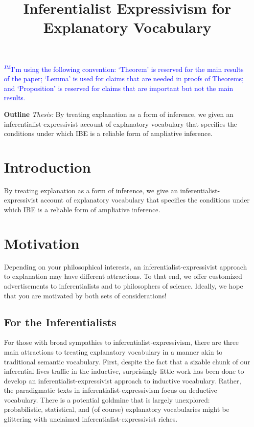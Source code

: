 \documentclass{article}
\theoremstyle{definition}
\theoremstyle{definition}
\theoremstyle{definition}
\theoremstyle{definition}
\theoremstyle{remark}
\theoremstyle{definition}
\theoremstyle{definition}
\newcommand{\jm}[1]{\textcolor{blue}{$^{\textrm{JM}}${#1}}}
\begin{document}
\sloppy
\title{Inferentialist Expressivism for Explanatory Vocabulary
}

\large
\raggedbottom

\maketitle

\jm{I'm using the following convention: `Theorem' is reserved for the main results of the paper; `Lemma' is used for claims that are needed in proofs of Theorems; and `Proposition' is reserved for claims that are important but not the main results.}

\textbf{Outline}
\textit{Thesis:} By treating explanation as a form of inference, we given an inferentialist-expressivist account of explanatory vocabulary that specifies the conditions under which IBE is a reliable form of ampliative inference.
\section{Introduction}
By treating explanation as a form of inference, we give an inferentialist-expressivist account of explanatory vocabulary that specifies the conditions under which IBE is a reliable form of ampliative inference.
\section{Motivation}
Depending on your philosophical interests, an inferentialist-expressivist approach to explanation may have different attractions. To that end, we offer customized advertisements to inferentialists and to philosophers of science. Ideally, we hope that you are motivated by both sets of considerations!
\subsection{For the Inferentialists}
For those with broad sympathies to inferentialist-expressivism, there are three main attractions to treating explanatory vocabulary in a manner akin to traditional semantic vocabulary. First, despite the fact that a sizable chunk of our inferential lives traffic in the inductive, surprisingly little work has been done to develop an inferentialist-expressivist approach to inductive vocabulary. Rather, the paradigmatic texts in inferentialist-expressivism focus on deductive vocabulary. There is a potential goldmine that is largely unexplored: probabilistic, statistical, and (of course) explanatory vocabularies might be glittering with unclaimed inferentialist-expressivist riches.
\end{document}

